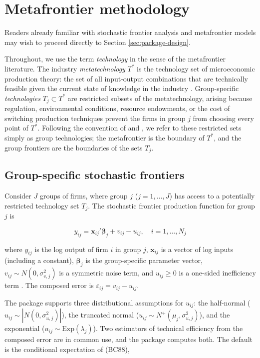 \section{Metafrontier methodology}\label{sec:methodology}

Readers already familiar with stochastic frontier analysis and
metafrontier models may wish to proceed directly to Section \ref{sec:package-design}.

Throughout, we use the term \emph{technology} in the sense of the metafrontier
literature. The industry \emph{metatechnology} \(T^*\) is the technology set of
microeconomic production theory: the set of all input-output combinations
that are technically feasible given the current state of knowledge in the
industry \citep{odonnell2008}. Group-specific \emph{technologies} \(T_j \subset T^*\)
are restricted subsets of the metatechnology, arising because regulation,
environmental conditions, resource endowments, or the cost of switching
production techniques prevent the firms in group \(j\) from choosing every
point of \(T^*\). Following the convention of \citet{battese2004} and \citet{odonnell2008},
we refer to these restricted sets simply as group technologies; the
metafrontier is the boundary of \(T^*\), and the group frontiers are the
boundaries of the sets \(T_j\).

\subsection{Group-specific stochastic frontiers}\label{sec:group-frontiers}

Consider \(J\) groups of firms, where group \(j\) (\(j = 1, \ldots, J\)) has
access to a potentially restricted technology set \(T_j\). The
stochastic frontier production function for group \(j\) is

\begin{equation}
y_{ij} = \mathbf{x}_{ij}'\boldsymbol{\beta}_j + v_{ij} - u_{ij},
\quad i = 1, \ldots, N_j
\label{eq:sfa}
\end{equation}

where \(y_{ij}\) is the log output of firm \(i\) in group \(j\),
\(\mathbf{x}_{ij}\) is a vector of log inputs (including a constant),
\(\boldsymbol{\beta}_j\) is the group-specific parameter vector,
\(v_{ij} \sim N(0, \sigma^2_{v,j})\) is a symmetric noise term, and
\(u_{ij} \geq 0\) is a one-sided inefficiency term \citep{aigner1977}. The composed
error is \(\varepsilon_{ij} = v_{ij} - u_{ij}\).

The  package supports three distributional assumptions
for \(u_{ij}\): the half-normal
(\(u_{ij} \sim |N(0, \sigma^2_{u,j})|\)), the truncated normal
(\(u_{ij} \sim N^+(\mu_j, \sigma^2_{u,j})\)), and the exponential
(\(u_{ij} \sim \text{Exp}(\lambda_j)\)). Two estimators of technical
efficiency from the composed error are in common use, and the package
computes both. The default is the conditional expectation of \citet{battese1988}
(BC88),


